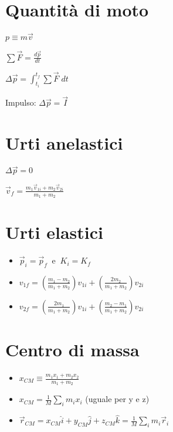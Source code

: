 \documentclass[a4paper,14pt,landscape]{extarticle}
\begin{document}
\begin{multicols*}{2}
    \section*{Quantità di moto}
    \begin{itemize}
        \begin{multicols*}{2}
            \item $p \equiv m\vec{v}$
            \item $\sum \vec{F} = \tfrac{d\vec{p}}{dt}$
            \item $\Delta \vec{p} = \int_{t_i}^{t_f} \sum\vec{F} \; dt$
            \item Impulso: $\Delta \vec{p} = \vec{I}$            
        \end{multicols*}
    \end{itemize}

    \section*{Urti anelastici}
    \begin{itemize}
        \begin{multicols*}{2}
            \item $\Delta \vec{p} = 0$
            \item $\vec{v}_f = \tfrac{m_1\vec{v}_{1i} + m_2\vec{v}_{2i}}{m_1 + m_2}$
        \end{multicols*}
    \end{itemize}

    \section*{Urti elastici}
    \begin{itemize}
        \item $\vec{p}_i = \vec{p}_f \;\; \text{e} \;\; K_i = K_f$
        \item $v_{1f} = \left( \tfrac{m_1 - m_2}{m_1 + m_2} \right) v_{1i} + \left( \tfrac{2m_2}{m_1 + m_2} \right) v_{2i}$
        \item $v_{2f} = \left( \tfrac{2m_1}{m_1 + m_2} \right) v_{1i} + \left( \tfrac{m_2 - m_1}{m_1 + m_2} \right) v_{2i}$
    \end{itemize}

    \section*{Centro di massa}
    \begin{itemize}
        \item $x_{CM} \equiv \frac{m_1x_1 + m_2x_2}{m_1 + m_2}$
        \item $x_{CM} = \frac{1}{M}\sum_i m_ix_i$ (uguale per y e z)
        \item $\vec{r}_{CM} = x_{CM}\hat{i} + y_{CM}\hat{j} + z_{CM}\hat{k} = \frac{1}{M} \sum_i m_i \vec{r}_i$
    \end{itemize}

\end{multicols*}
\end{document}
